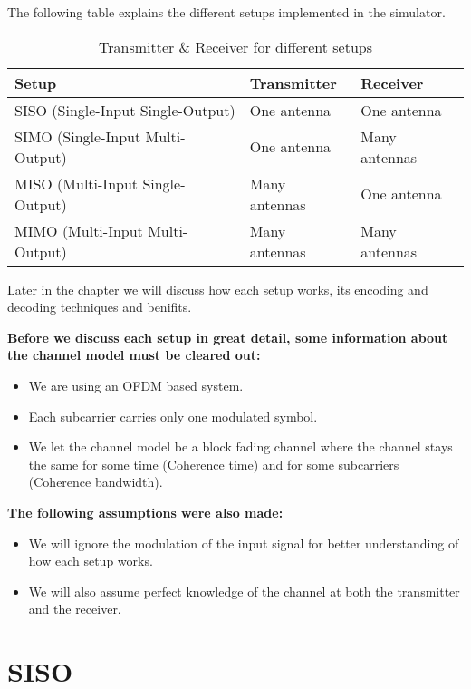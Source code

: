 The following table explains the different setups implemented in the simulator.
\begin{table}[!ht]
    \centering
    \caption{Transmitter \& Receiver for different setups}
    \label{tbl:mytable}
    \begin{tabular}{lll}
        \toprule
        Setup & Transmitter & Receiver \\
        \midrule
        SISO (Single-Input Single-Output)  & One antenna   & One antenna   \\
        SIMO (Single-Input Multi-Output)   & One antenna   & Many antennas \\
        MISO (Multi-Input Single-Output)   & Many antennas & One antenna   \\
        MIMO (Multi-Input Multi-Output)    & Many antennas & Many antennas \\
        \bottomrule
    \end{tabular}
\end{table}

Later in the chapter we will discuss how each setup works, its encoding and decoding techniques and benifits.

\begin{GrayBox}
    \textbf{Before we discuss each setup in great detail, some information about the channel model must be cleared out:}
    \begin{itemize}
        \item We are using an OFDM based system.
        \item Each subcarrier carries only one modulated symbol.
        \item We let the channel model be a block fading channel where the channel stays the same for some time (Coherence time) and for some subcarriers (Coherence bandwidth).
    \end{itemize}

    \textbf{The following assumptions were also made:}
    \begin{itemize}
        \item We will ignore the modulation of the input signal for better understanding of how each setup works.
        \item We will also assume perfect knowledge of the channel at both the transmitter and the receiver.
    \end{itemize}

\end{GrayBox}

\section{SISO}

